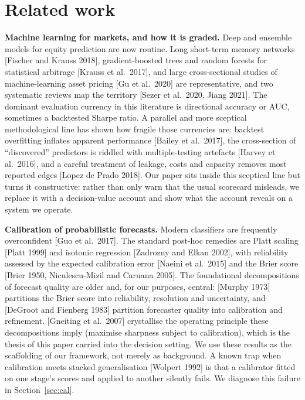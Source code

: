 \documentclass[10pt, a4paper, oneside]{article}
\theoremstyle{definition}
\theoremstyle{plain}
\begin{document}
\section{Related work}
\label{sec:related}
\noindent\textbf{Machine learning for markets, and how it is graded.}
Deep and ensemble models for equity prediction are now routine. Long short-term
memory networks [Fischer and Krauss 2018], gradient-boosted trees and random forests
for statistical arbitrage [Krauss et al.\ 2017], and large cross-sectional studies of
machine-learning asset pricing [Gu et al.\ 2020] are representative, and two
systematic reviews map the territory [Sezer et al.\ 2020, Jiang 2021]. The dominant
evaluation currency in this literature is directional accuracy or AUC, sometimes a
backtested Sharpe ratio. A parallel and more sceptical methodological line has shown
how fragile those currencies are: backtest overfitting inflates apparent performance
[Bailey et al.\ 2017], the cross-section of ``discovered'' predictors is riddled with
multiple-testing artefacts [Harvey et al.\ 2016], and a careful treatment of leakage,
costs and capacity removes most reported edges [Lopez de Prado 2018]. Our paper sits
inside this sceptical line but turns it constructive: rather than only warn that the
usual scorecard misleads, we replace it with a decision-value account and show what
the account reveals on a system we operate.

\noindent\textbf{Calibration of probabilistic forecasts.}
Modern classifiers are frequently overconfident [Guo et al.\ 2017]. The standard
post-hoc remedies are Platt scaling [Platt 1999] and isotonic regression
[Zadrozny and Elkan 2002], with reliability assessed by the expected calibration
error [Naeini et al.\ 2015] and the Brier score [Brier 1950, Niculescu-Mizil and
Caruana 2005]. The foundational decompositions of forecast quality are older and,
for our purposes, central: [Murphy 1973] partitions the Brier score into reliability,
resolution and uncertainty, and [DeGroot and Fienberg 1983] partition forecaster
quality into calibration and refinement. [Gneiting et al.\ 2007] crystallise the
operating principle these decompositions imply (maximise sharpness subject to
calibration), which is the thesis of this paper carried into the decision setting.
We use these results as the scaffolding of our framework, not merely as background.
A known trap when calibration meets stacked generalisation
[Wolpert 1992] is that a calibrator fitted on one stage's scores and applied to
another silently fails. We diagnose this failure in Section~\ref{sec:cal}.
\end{document}

